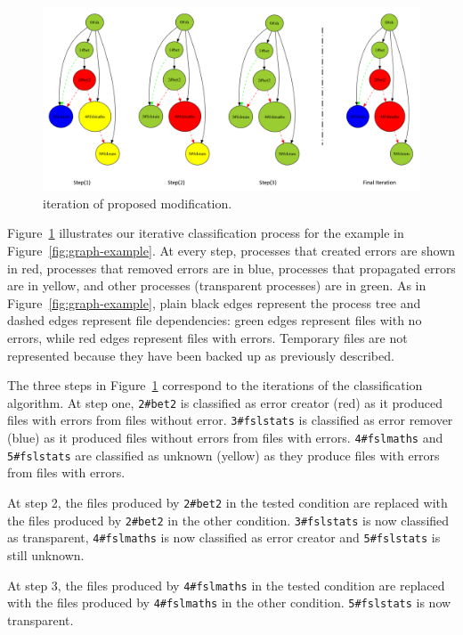 \documentclass{article}
\begin{document}
{\begin{figure}[H]
\centering
  \includegraphics[scale=0.5]{images/iterative_modif}
  \caption{iteration of proposed modification.}
  \label{fig:iterations}
\end{figure}

Figure~\ref{fig:iterations} illustrates our iterative classification 
process for the example in Figure~\ref{fig:graph-example}. At every 
step, processes that created errors are shown in red, processes that 
removed errors are in blue, processes that propagated errors are in 
yellow, and other processes (transparent processes) are in green. As in 
Figure~\ref{fig:graph-example}, plain black edges represent the process 
tree and dashed edges represent file dependencies: green edges 
represent files with no errors, while red edges represent files with 
errors. Temporary files are not represented because they have been 
backed up as previously described.

The three steps in Figure~\ref{fig:iterations} correspond to the 
iterations of the classification algorithm. At step one, \texttt{2\#bet2} 
is classified as error creator (red) as it produced files with errors 
from files without error. \texttt{3\#fslstats} is classified as error 
remover (blue) as it produced files without errors from files with 
errors. \texttt{4\#fslmaths} and \texttt{5\#fslstats} are classified as 
unknown (yellow) as they produce files with errors from files with 
errors.

At step 2, the files produced by \texttt{2\#bet2} in the tested 
condition are replaced with the files produced by \texttt{2\#bet2} in 
the other condition. \texttt{3\#fslstats} is now classified as 
transparent, \texttt{4\#fslmaths} is now classified as error creator 
and \texttt{5\#fslstats} is still unknown.

At step 3, the files produced by \texttt{4\#fslmaths} in the tested 
condition are replaced with the files produced by \texttt{4\#fslmaths} 
in the other condition. \texttt{5\#fslstats} is now transparent.
 
}
\end{document}

